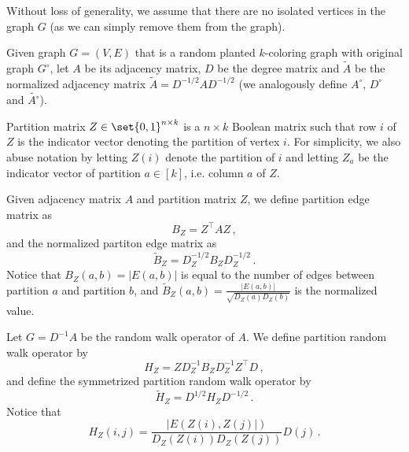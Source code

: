 Without loss of generality, we assume that there are no isolated vertices in the graph $G$ (as we can simply remove them from the graph).

Given graph $G=(V, E)$ that is a random planted $k$-coloring graph with original graph $G^{\circ}$, let $A$ be its adjacency matrix, $D$ be the degree matrix and $\tilde{A}$ be the normalized adjacency matrix $\tilde{A} = D^{-1/2} A D^{-1/2}$ (we analogously define $A^{\circ}$, $D^{\circ}$ and $\tilde{A^{\circ}}$).

\begin{definition}
\label{def:rp_Z_partition}
    Partition matrix $Z \in \set{0, 1}^{n \times k}$ is a $n \times k$ Boolean matrix such that row $i$ of $Z$ is the indicator vector denoting the partition of vertex $i$. For simplicity, we also abuse notation by letting $Z(i)$ denote the partition of $i$ and letting $Z_a$ be the indicator vector of partition $a \in [k]$, i.e. column $a$ of $Z$.
\end{definition}

\begin{definition}
\label{def:rp_B_partition_edge}
    Given adjacency matrix $A$ and partition matrix $Z$, we define partition edge matrix as
    \begin{equation*}
        B_Z = Z^{\top} A Z \,,
    \end{equation*}
    and the normalized partiton edge matrix as
    \begin{equation*}
        \tilde{B}_Z = D_Z^{-1/2} B_Z D_Z^{-1/2} \,.
    \end{equation*}
    Notice that $B_Z(a, b) = |E(a, b)|$ is equal to the number of edges between partition $a$ and partition $b$, and $\tilde{B}_Z(a, b) = \frac{|E(a, b)|}{\sqrt{D_Z(a) D_Z(b)}}$ is the normalized value.
\end{definition}

\begin{definition}
\label{def:rp_H_random_walk}
    Let $G=D^{-1} A$ be the random walk operator of $A$. We define partition random walk operator by
    \begin{equation*}
        H_Z = Z D_Z^{-1} B_Z D_Z^{-1} Z^{\top} D \,,
    \end{equation*}
    and define the symmetrized partition random walk operator by
    \begin{equation*}
        \tilde{H}_Z = D^{1/2} H_Z D^{-1/2} \,.
    \end{equation*}
    Notice that
    \begin{equation*}
        H_Z(i, j) = \frac{|E(Z(i), Z(j)|)}{D_Z(Z(i)) D_Z(Z(j))} D(j) \,.
    \end{equation*}
\end{definition}

